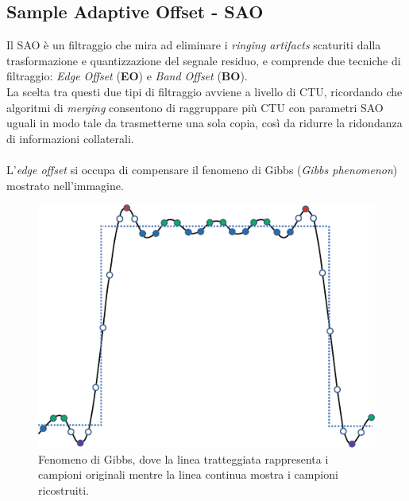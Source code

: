 
\subsection{Sample Adaptive Offset - SAO}
Il SAO è un filtraggio che mira ad eliminare i \emph{ringing artifacts} 
scaturiti dalla trasformazione e quantizzazione del segnale residuo, e 
comprende due tecniche di filtraggio: \emph{Edge Offset} (\textbf{EO}) e 
\emph{Band Offset} (\textbf{BO}).\\
La scelta tra questi due tipi di filtraggio avviene a livello di CTU, ricordando
che  algoritmi di \emph{merging} consentono di raggruppare più CTU con parametri
SAO uguali in modo tale da trasmetterne una sola copia, così da ridurre la 
ridondanza di informazioni collaterali.
\\ \\
L'\emph{edge offset} si occupa di compensare il fenomeno di Gibbs (\emph{Gibbs
phenomenon}) mostrato nell'immagine.

\begin{figure}[H]
  \centering
  \captionsetup{justification=raggedright}
  \includegraphics[scale=0.35]{Figures/SAO_Gibbs}
  \caption[Fenomeno di Gibbs]
  	  {Fenomeno di Gibbs, dove la linea tratteggiata rappresenta i
	   campioni originali mentre la linea continua mostra i campioni
	   ricostruiti.}
\end{figure}

